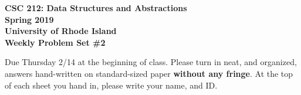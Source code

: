 \documentclass[11pt]{article}
\begin{document}
\thispagestyle{empty}

\begin{center}
    {\Large\bf CSC 212: Data Structures and Abstractions}\\
    \medskip
    {\Large\bf Spring 2019}\\
    \medskip
    {\Large\bf University of Rhode Island}\\
    \bigskip
    {\Large\bf Weekly Problem Set \#2}
\end{center}

Due Thursday 2/14 at the beginning of class. Please turn in neat, and organized, answers hand-written on standard-sized paper \textbf{without any fringe}. At the top of each sheet you hand in, please write your name, and ID.
\end{document}

